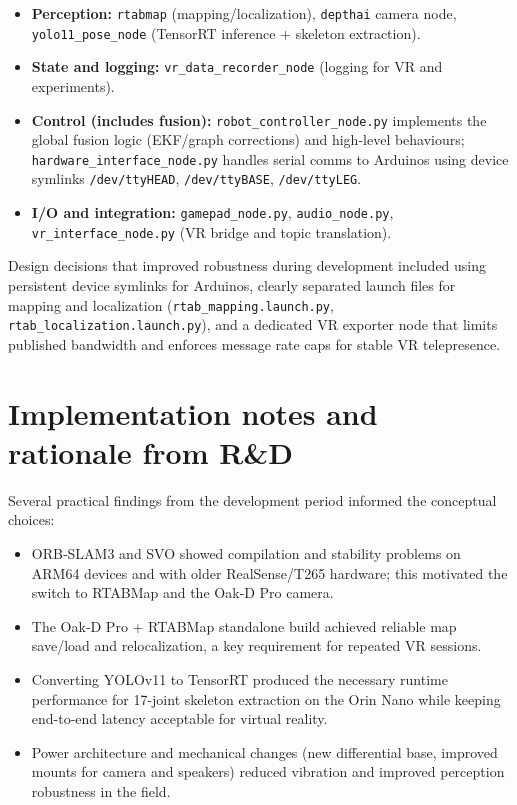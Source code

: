 \begin{itemize}
	\item \textbf{Perception:} \texttt{rtabmap} (mapping/localization), \texttt{depthai} camera node, \texttt{yolo11\_pose\_node} (TensorRT inference + skeleton extraction).
	\item \textbf{State and logging:} \texttt{vr\_data\_recorder\_node} (logging for VR and experiments).
	\item \textbf{Control (includes fusion):} \texttt{robot\_controller\_node.py} implements the global fusion logic (EKF/graph corrections) and high-level behaviours; \texttt{hardware\_interface\_node.py} handles serial comms to Arduinos using device symlinks \texttt{/dev/ttyHEAD}, \texttt{/dev/ttyBASE}, \texttt{/dev/ttyLEG}.
	\item \textbf{I/O and integration:} \texttt{gamepad\_node.py}, \texttt{audio\_node.py}, \texttt{vr\_interface\_node.py} (VR bridge and topic translation).
\end{itemize}

Design decisions that improved robustness during development included using persistent device symlinks for Arduinos, clearly separated launch files for mapping and localization (\texttt{rtab\_mapping.launch.py}, \texttt{rtab\_localization.launch.py}), and a dedicated VR exporter node that limits published bandwidth and enforces message rate caps for stable VR telepresence.

\section{Implementation notes and rationale from R\&D}

Several practical findings from the development period informed the conceptual choices:

\begin{itemize}
	\item ORB‑SLAM3 and SVO showed compilation and stability problems on ARM64 devices and with older RealSense/T265 hardware; this motivated the switch to RTABMap and the Oak‑D Pro camera.
	\item The Oak‑D Pro + RTABMap standalone build achieved reliable map save/load and relocalization, a key requirement for repeated VR sessions.
	\item Converting YOLOv11 to TensorRT produced the necessary runtime performance for 17-joint skeleton extraction on the Orin Nano while keeping end-to-end latency acceptable for virtual reality.
	\item Power architecture and mechanical changes (new differential base, improved mounts for camera and speakers) reduced vibration and improved perception robustness in the field.
\end{itemize}

